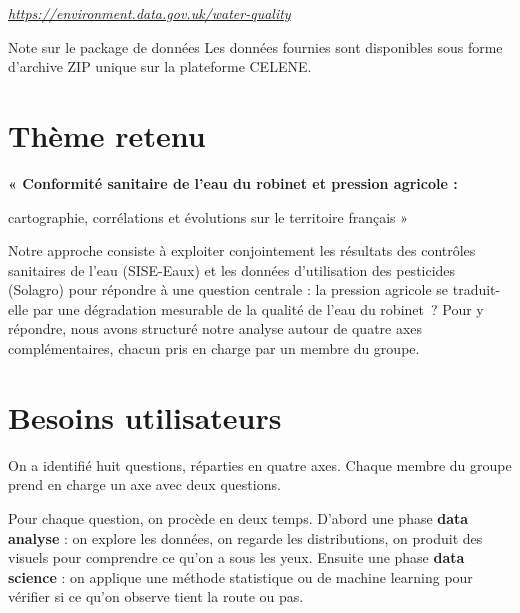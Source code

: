 \documentclass[a4paper,11pt]{article}
\begin{document}
{\color{txtgrey}\itshape\small \url{https://environment.data.gov.uk/water-quality}}

\begin{notebox}{Note sur le package de données}
Les données fournies sont disponibles sous forme d'archive ZIP unique sur la plateforme CELENE.
\end{notebox}

\section{Thème retenu}

\begin{themeretenu}
\begin{center}
{\large\bfseries\color{utblue} « Conformité sanitaire de l'eau du robinet et pression agricole :\par
\medskip
cartographie, corrélations et évolutions sur le territoire français »}
\end{center}
\end{themeretenu}

Notre approche consiste à exploiter conjointement les résultats des contrôles sanitaires de l'eau (SISE-Eaux) et les données d'utilisation des pesticides (Solagro) pour répondre à une question centrale : la pression agricole se traduit-elle par une dégradation mesurable de la qualité de l'eau du robinet~? Pour y répondre, nous avons structuré notre analyse autour de quatre axes complémentaires, chacun pris en charge par un membre du groupe.


\section{Besoins utilisateurs}

On a identifié huit questions, réparties en quatre axes. Chaque membre du groupe prend en charge un axe avec deux questions.

Pour chaque question, on procède en deux temps. D'abord une phase \textbf{data analyse} : on explore les données, on regarde les distributions, on produit des visuels pour comprendre ce qu'on a sous les yeux. Ensuite une phase \textbf{data science} : on applique une méthode statistique ou de machine learning pour vérifier si ce qu'on observe tient la route ou pas.
\end{document}
